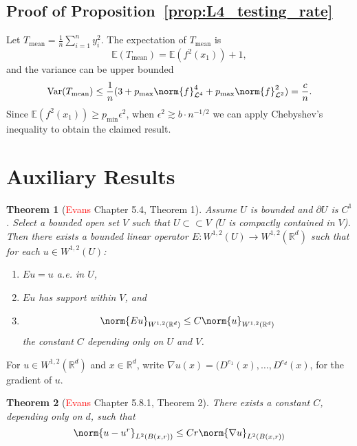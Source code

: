 \documentclass{article}
\newcommand{\Reals}{\mathbb{R}}
\newcommand{\Var}{\mathrm{Var}}
\newcommand{\1}{\mathbf{1}}
\newcommand{\Rd}{\Reals^d}
\newcommand{\Leb}{\mathcal{L}}
\newcommand{\Ebb}{\mathbb{E}}
\theoremstyle{alden}
\theoremstyle{aldenthm}
\newtheorem{theorem}{Theorem}
\theoremstyle{definition}
\theoremstyle{remark}
\begin{document}
\subsection{Proof of Proposition~\ref{prop:L4_testing_rate}}

Let $T_{\mathrm{mean}} = \frac{1}{n}\sum_{i = 1}^{n} y_i^2$. The expectation of $T_{\mathrm{mean}}$ is
\begin{equation*}
\Ebb(T_{\mathrm{mean}}) = \mathbb{E}(f^2(x_1)) + 1,
\end{equation*}
and the variance can be upper bounded
\begin{equation*}
\Var(T_{\mathrm{mean}}) \leq \frac{1}{n}(3 + p_{\max} \norm{f}_{\Leb^4}^4 + p_{\max}\norm{f}_{\Leb^2}^2) = \frac{c}{n}.
\end{equation*}
Since $\mathbb{E}(f^2(x_1)) \geq p_{\min} \epsilon^2$, when $\epsilon^2 \gtrsim b\cdot n^{-1/2}$ we can apply Chebyshev's inequality to obtain the claimed result.
\section{Auxiliary Results}

\begin{theorem}[\textcolor{red}{Evans} Chapter 5.4, Theorem 1]
	\label{thm:evans_extension}
	Assume $U$ is bounded and $\partial U$ is $C^1$. Select a bounded open set $V$ such that $U \subset \subset V$ ($U$ is compactly contained in $V$). Then there exists a bounded linear operator $E: W^{1,2}(U) \to W^{1,2}(\Rd)$ such that for each $u \in W^{1,2}(U)$:
	\begin{enumerate}
		\item $Eu = u$ a.e. in $U$,
		\item $Eu$ has support within $V$, and 
		\item 
		\begin{equation*}
		\norm{Eu}_{W^{1,2}(\Rd)} \leq C \norm{u}_{W^{1,2}(\Rd)}
		\end{equation*}
		the constant $C$ depending only on $U$ and $V$.
	\end{enumerate}
\end{theorem}

For $u \in W^{1,2}(\Rd)$ and $x \in \Rd$, write $\nabla u(x) = (D^{e_1}(x),\ldots,D^{e_d}(x)$, for the gradient of $u$.

\begin{theorem}[\textcolor{red}{Evans} Chapter 5.8.1, Theorem 2]
	\label{thm:evans_poincare}
	There exists a constant $C$, depending only on $d$, such that
	\begin{equation*}
	\norm{u - u^r}_{L^2(B(x,r))} \leq Cr\norm{\nabla u}_{L^2(B(x,r))}
	\end{equation*}
\end{theorem}
\end{document}
